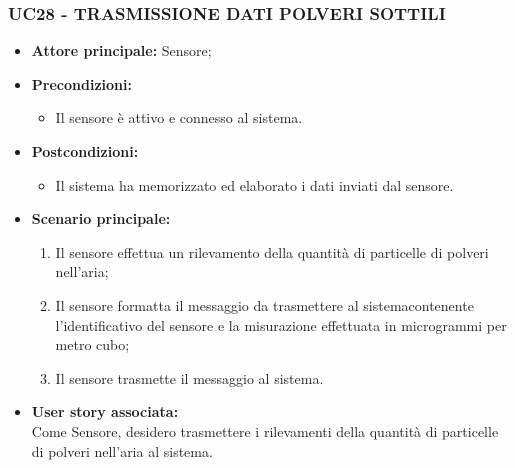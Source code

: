 \subsubsection{UC28 - TRASMISSIONE DATI POLVERI SOTTILI}
\begin{itemize}
    \item \textbf{Attore principale:} Sensore;
    \item \textbf{Precondizioni:}
        \begin{itemize}
            \item Il sensore è attivo e connesso al sistema. 
        \end{itemize}
    \item \textbf{Postcondizioni:}
        \begin{itemize}
            \item Il sistema ha memorizzato ed elaborato i dati inviati dal sensore.
        \end{itemize}
    \item \textbf{Scenario principale:}
        \begin{enumerate}
            \item Il sensore effettua un rilevamento della quantità di particelle di polveri nell'aria;
            \item Il sensore formatta il messaggio da trasmettere al sistemacontenente l'identificativo del sensore e la misurazione effettuata in
            microgrammi per metro cubo;
            \item Il sensore trasmette il messaggio al sistema.
        \end{enumerate}
    \item \textbf{User story associata:} \\
    Come Sensore, desidero trasmettere i rilevamenti della quantità di particelle di polveri nell'aria al sistema.
\end{itemize}
